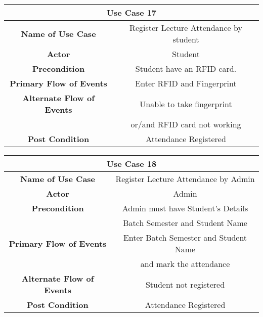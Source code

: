 \vspace{1cm}
\begin{center}
    \begin{tabular}{|c|c|}
        \hline
        \multicolumn{2}{|c|}{Use Case 17} \\
        \hline
        \textbf{Name of Use Case} & Register Lecture Attendance by student \\
        \hline
        \textbf{Actor} & Student \\
        \hline
        \textbf{Precondition} & Student have an RFID card. \\
        \hline
        \textbf{Primary Flow of Events} & Enter RFID and Fingerprint \\
        \hline
        \textbf{Alternate Flow of Events} & Unable to take fingerprint \\
        & or/and RFID card not working \\
        \hline
        \textbf{Post Condition} & Attendance Registered \\
        \hline
    \end{tabular}
\end{center}

\vspace{1cm}
\begin{center}
    \begin{tabular}{|c|c|}
        \hline
        \multicolumn{2}{|c|}{Use Case 18} \\
        \hline
        \textbf{Name of Use Case} & Register Lecture Attendance by Admin \\
        \hline
        \textbf{Actor} & Admin \\
        \hline
        \textbf{Precondition} & Admin must have Student's Details \\
        & Batch Semester and Student Name \\
        \hline
        \textbf{Primary Flow of Events} & Enter Batch Semester and Student Name \\
        & and mark the attendance \\
        \hline
        \textbf{Alternate Flow of Events} & Student not registered \\
        \hline
        \textbf{Post Condition} & Attendance Registered \\
        \hline
    \end{tabular}
\end{center}


